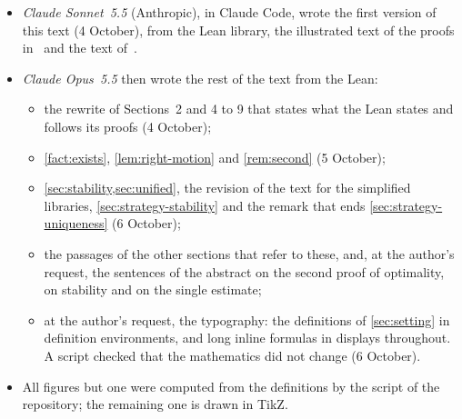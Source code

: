\begin{itemize}
\begin{itemize}
  \cref{thm:unified}, and made the stability proof take its optimality,
  uniqueness and local estimate from them (4 to 6 October);
  \item simplified the new libraries, keeping the formalization of~\cite{Baek}
  and the connection with formal-conjectures unchanged, and prepared version~5
  of the Palomar entry, whose Challenge states the certificate with the three
  results proved through it (6 October).
  \end{itemize}
\item \emph{Claude Sonnet~5.5} (Anthropic), in Claude Code, wrote the first
version of this text (4 October), from the Lean library, the illustrated text of
the proofs in~\cite{Companion} and the text of~\cite{Baek}.
\item \emph{Claude Opus~5.5} then wrote the rest of the text from the Lean:
  \begin{itemize}
  \item the rewrite of Sections~2 and 4 to 9 that states what the Lean states
  and follows its proofs (4 October);
  \item \cref{fact:exists}, \cref{lem:right-motion} and \cref{rem:second}
  (5 October);
  \item \cref{sec:stability,sec:unified}, the revision of the text for the
  simplified libraries, \cref{sec:strategy-stability} and the remark that ends
  \cref{sec:strategy-uniqueness} (6 October);
  \item the passages of the other sections that refer to these, and, at the
  author's request, the sentences of the abstract on the second proof of
  optimality, on stability and on the single estimate;
  \item at the author's request, the typography: the definitions of
  \cref{sec:setting} in definition environments, and long inline formulas in
  displays throughout. A script checked that the mathematics did not change
  (6 October).
  \end{itemize}
\item All figures but one were computed from the definitions by the script
 of the repository; the remaining one
is drawn in TikZ.
\end{itemize}

